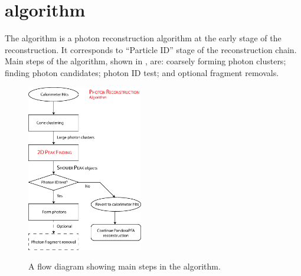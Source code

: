 



\section{\PhotonReconstruction algorithm}
\label{sec:photonRecostrcution}


The \PhotonReconstruction algorithm is a photon reconstruction  algorithm at the early stage of the reconstruction. It corresponds to ``Particle ID'' stage of the \pandora reconstruction chain.  Main steps of the \PhotonReconstruction algorithm, shown in , are:  coarsely forming photon clusters; finding photon candidates; photon ID test; and optional fragment removals. 


\begin{figure}[tbph]
\centering
{\includegraphics[width=0.45\textwidth]{photon/photonRecoFlow}}
\caption[A flow diagram of the \PhotonReconstruction algorithm.]
{A flow diagram showing main steps in the \PhotonReconstruction algorithm.}
\label{fig:photonPhotonRecoFlow}
\end{figure}


